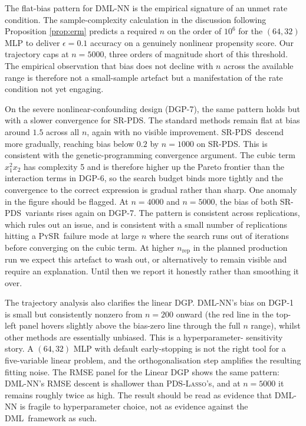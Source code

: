\documentclass[11pt, a4paper]{article}
\theoremstyle{plain}
\theoremstyle{definition}
\theoremstyle{remark}
\newcommand{\lasso}{\textsc{Lasso}}
\newcommand{\pds}{\textsc{PDS}}
\newcommand{\dml}{\textsc{DML}}
\newcommand{\pysr}{\textsc{PySR}}
\newcommand{\epds}{\textsc{SR-PDS}}
\begin{document}
The flat-bias pattern for \dml-NN is the empirical signature of
an unmet rate condition. The sample-complexity calculation in
the discussion following Proposition \ref{prop:erm} predicts a
required $n$ on the order of $10^6$ for the $(64, 32)$ MLP to
deliver $\epsilon = 0.1$ accuracy on a genuinely nonlinear
propensity score. Our trajectory caps at $n=5000$, three orders
of magnitude short of this threshold. The empirical observation
that bias does not decline with $n$ across the available range
is therefore not a small-sample artefact but a manifestation of
the rate condition not yet engaging.

On the severe nonlinear-confounding design (DGP-7), the same
pattern holds but with a slower convergence for \epds. The
standard methods remain flat at bias around $1.5$ across all
$n$, again with no visible improvement. \epds\
descend more gradually, reaching bias below $0.2$ by $n=1000$ on
\epds. This is consistent with
the genetic-programming convergence argument. The cubic term
$x_1^2 x_2$ has complexity 5 and is therefore higher up the
Pareto frontier than the interaction terms in DGP-6, so the
search budget binds more tightly and the convergence to the
correct expression is gradual rather than sharp. One anomaly
in the figure should be flagged. At $n=4000$ and
$n=5000$,
the bias of both \epds\ variants rises again on DGP-7. The pattern is
consistent across replications, which rules out an
issue, and is consistent with a small number of replications
hitting a \pysr\ failure mode at large $n$ where the search runs
out of iterations before converging on the cubic term. At higher
$n_{\text{rep}}$ in the planned production run we expect this
artefact to wash out, or alternatively to remain visible and
require an explanation. Until then we report it honestly rather
than smoothing it over.

The trajectory analysis also clarifies the linear DGP. \dml-NN's
bias on DGP-1 is small but consistently nonzero from $n=200$
onward (the red line in the top-left panel hovers slightly above
the bias-zero line through the full $n$ range), whilst other
methods are essentially unbiased. This is a hyperparameter-%
sensitivity story. A $(64, 32)$ MLP with default early-stopping
is not the right tool for a five-variable linear problem, and
the orthogonalisation step amplifies the resulting fitting
noise. The RMSE panel for the Linear DGP shows the same pattern:
\dml-NN's RMSE descent is shallower than \pds-\lasso's, and at
$n=5000$ it remains roughly twice as high. The result should be
read as evidence that \dml-NN is fragile to hyperparameter
choice, not as evidence against the \dml\ framework as such.
\end{document}
